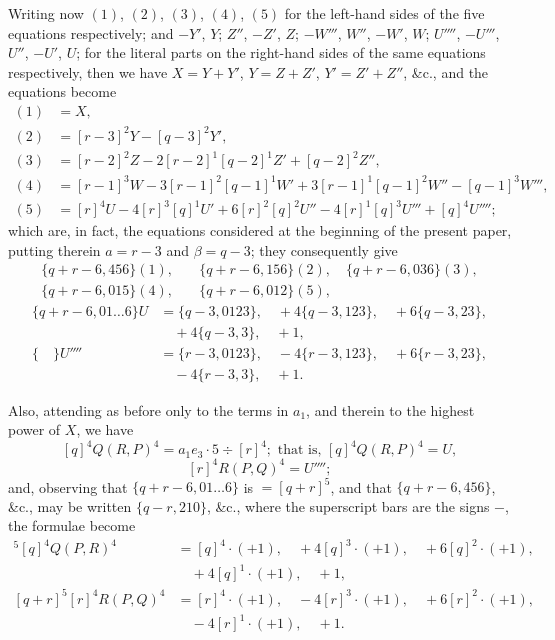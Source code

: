 \documentclass[12pt,a4paper]{article}
\theoremstyle{cayley}
\theoremstyle{definition}
\numberwithin{equation}{section}
\begin{document}
Writing now $(1)$, $(2)$, $(3)$, $(4)$, $(5)$ for the left-hand sides of the five equations respectively; and $-Y'$, $Y$; $Z''$, $-Z'$, $Z$; $-W'''$, $W''$, $-W'$, $W$; $U''''$, $-U'''$, $U''$, $-U'$, $U$; for the literal parts on the right-hand sides of the same equations respectively, then we have $X = Y + Y'$, $Y = Z + Z'$, $Y' = Z' + Z''$, \&c., and the equations become
\begin{align*}
(1) &= X, \\
(2) &= [r-3]^2 Y - [q-3]^2 Y', \\
(3) &= [r-2]^2 Z - 2[r-2]^1[q-2]^1 Z' + [q-2]^2 Z'', \\
(4) &= [r-1]^3 W - 3[r-1]^2[q-1]^1 W' + 3[r-1]^1[q-1]^2 W'' - [q-1]^3 W''', \\
(5) &= [r]^4 U - 4[r]^3[q]^1 U' + 6[r]^2[q]^2 U'' - 4[r]^1[q]^3 U''' + [q]^4 U'''';
\end{align*}
which are, in fact, the equations considered at the beginning of the present paper, putting therein $a = r-3$ and $\beta = q-3$; they consequently give
\begin{align*}
\{q + r - 6, 456\}(1), \quad &\{q + r - 6, 156\}(2), \quad \{q + r - 6, 036\}(3), \\
\{q + r - 6, 015\}(4), \quad &\{q + r - 6, 012\}(5),
\end{align*}
\begin{align*}
\{q + r - 6, 01 \ldots 6\}U &= \{q - 3, 0123\}, \quad +4\{q - 3, 123\}, \quad +6\{q - 3, 23\}, \\
&\quad +4\{q - 3, 3\}, \quad +1, \\
\{ \quad \}U'''' &= \{r - 3, 0123\}, \quad -4\{r - 3, 123\}, \quad +6\{r - 3, 23\}, \\
&\quad -4\{r - 3, 3\}, \quad +1.
\end{align*}

Also, attending as before only to the terms in $a_1$, and therein to the highest power of $X$, we have
\[
[q]^4 Q(R, P)^4 = a_1 e_3 \cdot 5 \div [r]^4; \text{ that is, } [q]^4 Q(R, P)^4 = U,
\]
\[
[r]^4 R(P, Q)^4 = U'''';
\]
and, observing that $\{q + r - 6, 01 \ldots 6\}$ is $= [q + r]^5$, and that $\{q + r - 6, 456\}$, \&c., may be written $\{q - r, 210\}$, \&c., where the superscript bars are the signs $-$, the formulae become
\begin{align*}
[q + r]^5 [q]^4 Q(P, R)^4 &= [q]^4 \cdot (+1), \quad +4[q]^3 \cdot (+1), \quad +6[q]^2 \cdot (+1), \\
&\quad +4[q]^1 \cdot (+1), \quad +1, \\
[q + r]^5 [r]^4 R(P, Q)^4 &= [r]^4 \cdot (+1), \quad -4[r]^3 \cdot (+1), \quad +6[r]^2 \cdot (+1), \\
&\quad -4[r]^1 \cdot (+1), \quad +1.
\end{align*}
\end{document}
